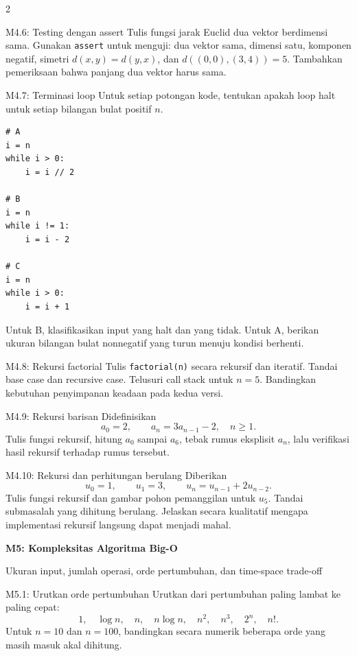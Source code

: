 \documentclass[9pt,a4paper]{article}
\newcommand{\bab}[2]{%
  \vspace{2pt}
  {\color{iteraBlue}\Large\bfseries #1}\par
  {\color{darkgray}\small #2}\par\vspace{3pt}
}
\begin{document}
\begin{multicols}{2}
\begin{qbox}[L3]{M4.6: Testing dengan assert}
Tulis fungsi jarak Euclid dua vektor berdimensi sama. Gunakan \texttt{assert} untuk menguji: dua vektor sama, dimensi satu, komponen negatif, simetri $d(x,y)=d(y,x)$, dan $d((0,0),(3,4))=5$. Tambahkan pemeriksaan bahwa panjang dua vektor harus sama.
\end{qbox}

\begin{qbox}[L3]{M4.7: Terminasi loop}
Untuk setiap potongan kode, tentukan apakah loop halt untuk setiap bilangan bulat positif $n$.
\begin{lstlisting}
# A
i = n
while i > 0:
    i = i // 2

# B
i = n
while i != 1:
    i = i - 2

# C
i = n
while i > 0:
    i = i + 1
\end{lstlisting}
Untuk B, klasifikasikan input yang halt dan yang tidak. Untuk A, berikan ukuran bilangan bulat nonnegatif yang turun menuju kondisi berhenti.
\end{qbox}

\begin{qbox}[L2]{M4.8: Rekursi factorial}
Tulis \texttt{factorial(n)} secara rekursif dan iteratif. Tandai base case dan recursive case. Telusuri call stack untuk $n=5$. Bandingkan kebutuhan penyimpanan keadaan pada kedua versi.
\end{qbox}

\begin{qbox}[L3]{M4.9: Rekursi barisan}
Didefinisikan
\[
a_0=2,\qquad a_n=3a_{n-1}-2,\quad n\ge1.
\]
Tulis fungsi rekursif, hitung $a_0$ sampai $a_6$, tebak rumus eksplisit $a_n$, lalu verifikasi hasil rekursif terhadap rumus tersebut.
\end{qbox}

\begin{qbox}[L4]{M4.10: Rekursi dan perhitungan berulang}
Diberikan
\[
u_0=1,\qquad u_1=3,\qquad u_n=u_{n-1}+2u_{n-2}.
\]
Tulis fungsi rekursif dan gambar pohon pemanggilan untuk $u_5$. Tandai submasalah yang dihitung berulang. Jelaskan secara kualitatif mengapa implementasi rekursif langsung dapat menjadi mahal.
\end{qbox}

\bab{M5: Kompleksitas Algoritma Big-O}{Ukuran input, jumlah operasi, orde pertumbuhan, dan time-space trade-off}

\begin{qbox}[L1]{M5.1: Urutkan orde pertumbuhan}
Urutkan dari pertumbuhan paling lambat ke paling cepat:
\[
1,\quad \log n,\quad n,\quad n\log n,\quad n^2,\quad n^3,\quad 2^n,\quad n!.
\]
Untuk $n=10$ dan $n=100$, bandingkan secara numerik beberapa orde yang masih masuk akal dihitung.
\end{qbox}


\end{multicols}
\end{document}
